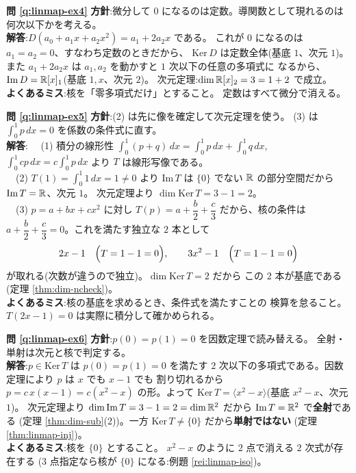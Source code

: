 \bigskip
\noindent\textbf{問 \ref{q:linmap-ex4}}\quad
\textbf{方針}:微分して $0$ になるのは定数。導関数として現れるのは
何次以下かを考える。\\
\textbf{解答}:$D(a_0 + a_1 x + a_2 x^2) = a_1 + 2a_2 x$ である。
これが $0$ になるのは $a_1 = a_2 = 0$、すなわち定数のときだから、
$\mathrm{Ker}\,D$ は定数全体(基底 $1$、次元 $1$)。
また $a_1 + 2a_2 x$ は $a_1, a_2$ を動かすと $1$ 次以下の任意の多項式に
なるから、$\mathrm{Im}\,D = \mathbb{R}[x]_1$(基底 $1, x$、次元 $2$)。
次元定理:$\dim \mathbb{R}[x]_2 = 3 = 1 + 2$ で成立。\\
\textbf{よくあるミス}:核を「零多項式だけ」とすること。
定数はすべて微分で消える。

\bigskip
\noindent\textbf{問 \ref{q:linmap-ex5}}\quad
\textbf{方針}:(2) は先に像を確定して次元定理を使う。
(3) は $\int_0^1 p\,dx = 0$ を係数の条件式に直す。\\
\textbf{解答}:
　(1) 積分の線形性
$\int_0^1 (p + q)\,dx = \int_0^1 p\,dx + \int_0^1 q\,dx$,
$\int_0^1 cp\,dx = c\int_0^1 p\,dx$ より $T$ は線形写像である。\\
　(2) $T(1) = \int_0^1 1\,dx = 1 \neq 0$ より $\mathrm{Im}\,T$ は
$\{0\}$ でない $\mathbb{R}$ の部分空間だから $\mathrm{Im}\,T = \mathbb{R}$、次元 $1$。
次元定理より $\dim \mathrm{Ker}\,T = 3 - 1 = 2$。\\
　(3) $p = a + bx + cx^2$ に対し
$T(p) = a + \dfrac{b}{2} + \dfrac{c}{3}$ だから、核の条件は
$a + \dfrac{b}{2} + \dfrac{c}{3} = 0$。これを満たす独立な $2$ 本として
\[
2x - 1 \quad \Bigl(T = 1 - 1 = 0\Bigr), \qquad
3x^2 - 1 \quad \Bigl(T = 1 - 1 = 0\Bigr)
\]
が取れる(次数が違うので独立)。$\dim \mathrm{Ker}\,T = 2$ だから
この $2$ 本が基底である(定理 \ref{thm:dim-ncheck})。\\
\textbf{よくあるミス}:核の基底を求めるとき、条件式を満たすことの
検算を怠ること。$T(2x - 1) = 0$ は実際に積分して確かめられる。

\bigskip
\noindent\textbf{問 \ref{q:linmap-ex6}}\quad
\textbf{方針}:$p(0) = p(1) = 0$ を因数定理で読み替える。
全射・単射は次元と核で判定する。\\
\textbf{解答}:$p \in \mathrm{Ker}\,T$ は $p(0) = p(1) = 0$ を満たす
$2$ 次以下の多項式である。因数定理により $p$ は $x$ でも $x - 1$ でも
割り切れるから $p = c\,x(x - 1) = c(x^2 - x)$ の形。よって
$\mathrm{Ker}\,T = \langle x^2 - x \rangle$(基底 $x^2 - x$、次元 $1$)。
次元定理より $\dim \mathrm{Im}\,T = 3 - 1 = 2 = \dim \mathbb{R}^2$ だから
$\mathrm{Im}\,T = \mathbb{R}^2$ で\textbf{全射}である
(定理 \ref{thm:dim-sub}(2))。一方
$\mathrm{Ker}\,T \neq \{0\}$ だから\textbf{単射ではない}
(定理 \ref{thm:linmap-inj})。\\
\textbf{よくあるミス}:核を $\{0\}$ とすること。
$x^2 - x$ のように $2$ 点で消える $2$ 次式が存在する
($3$ 点指定なら核が $\{0\}$ になる:例題 \ref{rei:linmap-iso})。

